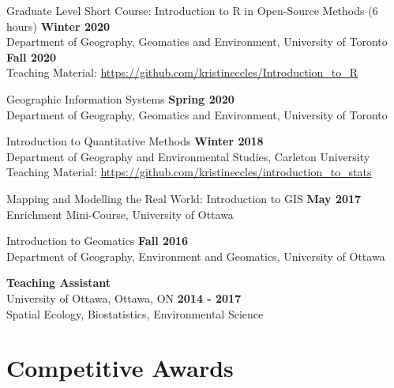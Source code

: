 \documentclass[margin,line]{res}
\begin{document}
\begin{resume}
Graduate Level Short Course: Introduction to R in Open-Source Methods (6 hours) \hfill {\textbf{Winter 2020}}\\
Department of Geography, Geomatics and Environment, University of Toronto \hfill {\textbf{Fall 2020}}
\\Teaching Material: \url{https://github.com/kristineccles/Introduction_to_R}

Geographic Information Systems \hfill {\textbf{Spring 2020}}\\
Department of Geography, Geomatics and Environment, University of Toronto

Introduction to Quantitative Methods
 \hfill {\textbf{Winter 2018}}\\
Department of Geography and Environmental Studies, Carleton University\\
Teaching Material: \url{https://github.com/kristineccles/introduction_to_stats}

Mapping and Modelling the Real World: Introduction to GIS \hfill {\textbf{May 2017}}\\
Enrichment Mini-Course, University of Ottawa

Introduction to Geomatics
\hfill {\textbf{Fall 2016}}\\
Department of Geography, Environment and Geomatics, University of Ottawa

\textbf{Teaching Assistant }\\
University of Ottawa, Ottawa, ON
\hfill {\textbf{2014 - 2017}}\\
Spatial Ecology, Biostatistics, Environmental Science

\vspace*{.1in}

\section{\sc Competitive Awards}


\end{resume}
\end{document}
